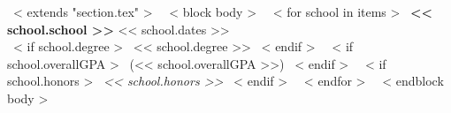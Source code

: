 ~< extends "section.tex" >~
~< block body >~
~< for school in items >~
  {\bf << school.school >>}
  {\hfill}
  << school.dates >> \\
  ~< if school.degree >~
    \hspace*{1em} 
    << school.degree >>
  ~< endif >~
  ~< if school.overallGPA >~
    (<< school.overallGPA >>)
  ~< endif >~
  ~< if school.honors >~
    \newline
    {\it << school.honors >>}
  ~< endif >~
  \newline
~< endfor >~
~< endblock body >~

